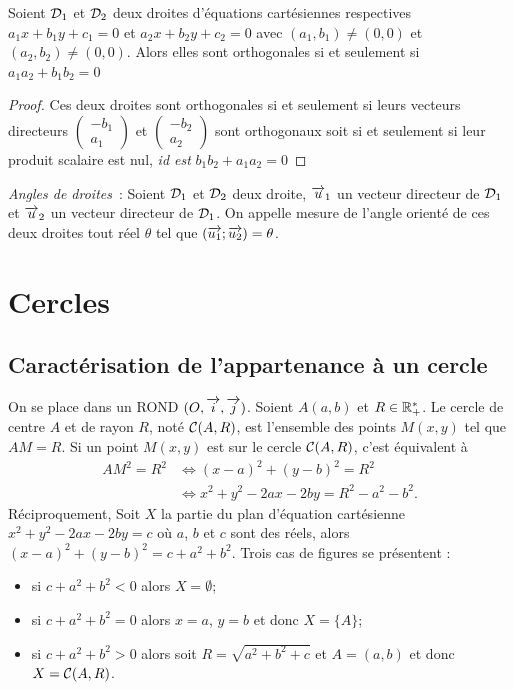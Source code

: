 \begin{prop}
  Soient \(\mathcal{D}_1\) et \(\mathcal{D}_2\) deux droites d'équations cartésiennes 
  respectives \(a_1x + b_1y + c_1 = 0\) et \(a_2x + b_2y + c_2 = 0\) avec 
  \((a_1 , b_1) \neq (0 , 0)\) et \((a_2 , b_2) \neq (0 , 0)\). Alors elles 
  sont orthogonales si et seulement si \(a_1 a_2 + b_1 b_2 = 0\)
\end{prop}

\begin{proof}
  Ces deux droites sont orthogonales si et seulement si leurs vecteurs 
  directeurs \(\begin{pmatrix} -b_1 \\ a_1 \end{pmatrix}\) et 
  \(\begin{pmatrix} -b_2 \\ a_2 \end{pmatrix}\) sont orthogonaux soit si et 
  seulement si leur produit scalaire est nul, \emph{id est} \(b_1 b_2 + a_1 
  a_2 = 0\)
\end{proof}

\emph{Angles de droites}~:
Soient \(\mathcal{D}_1\) et \(\mathcal{D}_2\) deux droite, \(\overrightarrow{u}_1\) un vecteur directeur de 
\(\mathcal{D}_1\) et \(\overrightarrow{u}_2\) un vecteur directeur de \(\mathcal{D}_1\). On appelle mesure de 
l'angle orienté de ces deux droites tout réel \(\theta\) tel que 
\((\overrightarrow{u_1};\overrightarrow{u_2}) = \theta\).

\section{Cercles}
\label{sec:cercle}

\subsection{Caractérisation de l'appartenance à un cercle}
\label{sec:caractcercle}

On se place dans un ROND \((O , \overrightarrow{i} , \overrightarrow{j})\). Soient \(A(a , b)\) et \(R \in 
\mathbb{R}_{+}^{*}\). Le cercle de centre \(A\) et de rayon \(R\), noté 
\(\mathcal{C}(A,R)\), est l'ensemble des points \(M(x , y)\) tel que \(AM = R\). 
Si un point \(M(x , y)\) est sur le cercle \(\mathcal{C}(A,R)\), c'est équivalent 
à
\begin{align}
  AM^2 = R^2 & \iff (x - a)^2 + (y - b)^2 = R^2\\
             &\iff x^2 + y^2 - 2ax - 2by = R^2 - a^2 - b^2.
\end{align}
Réciproquement, Soit \(X\) la partie du plan d'équation cartésienne \(x^2 + 
y^2 - 2ax - 2by = c\) où \(a\), \(b\) et \(c\) sont des réels, alors \((x - 
a)^2 + (y - b)^2 = c + a^2 + b^2\). Trois cas de figures se présentent :
\begin{itemize}
  \item si \(c + a^2 + b^2<0\) alors \(X = \emptyset\);
  \item si \(c + a^2 + b^2 = 0\) alors \(x = a\), \(y = b\) et donc \(X = 
    \{A\}\);
  \item si \(c + a^2 + b^2>0\) alors soit \(R = \sqrt{a^2 + b^2 + c}\) et \(A 
    = (a , b)\) et donc \(X = \mathcal{C}(A,R)\).
\end{itemize}

